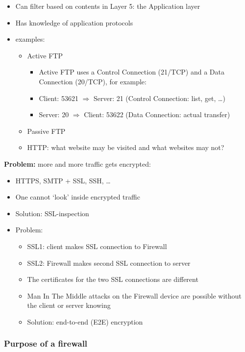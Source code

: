 \documentclass{article}
\begin{document}
\begin{itemize}
    \item Can filter based on contents in Layer 5: the Application layer
    \item Has knowledge of application protocols
    \item examples:
    \begin{itemize}
        \item Active FTP
        \begin{itemize}
            \item Active FTP uses a Control Connection (21/TCP) and a Data Connection (20/TCP), for example:
            \item Client: 53621 $\Rightarrow$ Server: 21 (Control Connection: list, get, \dots)
            \item Server: 20 $\Rightarrow$ Client: 53622 (Data Connection: actual transfer)
        \end{itemize}
        \item Passive FTP
        \item HTTP: what website may be visited and what websites may not?
    \end{itemize}
\end{itemize}

\textbf{Problem:} more and more traffic gets encrypted:

\begin{itemize}
    \item HTTPS, SMTP + SSL, SSH, \dots
    \item One cannot `look' inside encrypted traffic
    \item Solution: SSL-inspection
    \item Problem:
    \begin{itemize}
        \item SSL1: client makes SSL connection to Firewall
        \item SSL2: Firewall makes second SSL connection to server
        \item The certificates for the two SSL connections are different
        \item Man In The Middle attacks on the Firewall device are possible without the client or server knowing
        \item Solution: end-to-end (E2E) encryption
    \end{itemize}
\end{itemize}

\subsubsection{Purpose of a firewall}
\end{document}
